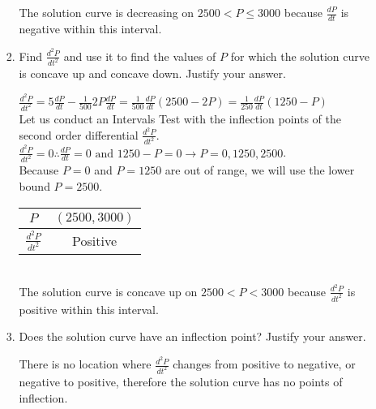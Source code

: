 \documentclass[10pt,letterpaper]{report}
\begin{document}
\begin{enumerate}
\begin{enumerate}
\begin{enumerate}
        The solution curve is decreasing on $2500< P\leq 3000$ because $\frac{dP}{dt}$ is negative within this interval. \\
        
      \item{Find $\frac{d^{2}P}{dt^{2}}$ and use it to find the values of $P$ for which the solution curve is concave up and concave down. Justify your answer. \\}
      
        $\frac{d^{2}P}{dt^{2}}=5\frac{dP}{dt}-\frac{1}{500}2P\frac{dP}{dt}=\frac{1}{500}\frac{dP}{dt}\left(2500-2P\right)=\frac{1}{250}\frac{dP}{dt}\left(1250-P\right)$ \\
        
        Let us conduct an Intervals Test with the inflection points of the second order differential $\frac{d^{2}P}{dt^{2}}$. \\
        
        $\frac{d^{2}P}{dt^{2}}=0\therefore \frac{dP}{dt}=0 \text{ and } 1250-P=0\rightarrow P=0, 1250, 2500$. \\
        
        Because $P=0$ and $P=1250$ are out of range, we will use the lower bound $P=2500$. 
        
        \begin{center}
          \begin{tabular}{| c | c |}
            \hline
            $P$ & $(2500, 3000)$ \\
            \hline
            $\frac{d^{2}P}{dt^{2}}$ & Positive \\
            \hline
          \end{tabular}
        \end{center} \\
        
        The solution curve is concave up on $2500<P<3000$ because $\frac{d^{2}P}{dt^{2}}$ is positive within this interval. \\
        
      \item{Does the solution curve have an inflection point? Justify your answer. \\}
      
        There is no location where $\frac{d^{2}P}{dt^{2}}$ changes from positive to negative, or negative to positive, therefore the solution curve has no points of inflection. \\
      

\end{enumerate}
\end{enumerate}
\end{enumerate}
\end{document}
